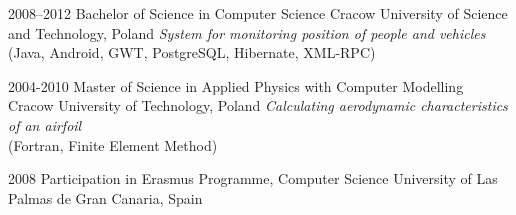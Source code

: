 \documentclass[]{gaza-cv} %
\begin{document}
\begin{entrylist}

\entry
{2008--2012}
{Bachelor of Science {\normalfont in Computer Science}}
{Cracow University of Science and Technology, Poland}
{\emph{System for monitoring position of people and vehicles} \\(Java, Android, GWT, PostgreSQL, Hibernate, XML-RPC)}


\entry
{2004-2010}
{Master of Science {\normalfont in Applied Physics with Computer Modelling}}
{Cracow University of Technology, Poland}
{\emph{Calculating aerodynamic characteristics of an airfoil} \\(Fortran, Finite Element Method)}



\entry
{2008}
{Participation in Erasmus Programme, {\normalfont Computer Science}}
{University of Las Palmas de Gran Canaria, Spain}
{}

\end{entrylist}
\end{document}

